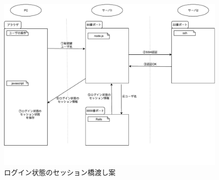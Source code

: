 \begin{figure}[h]
    \includegraphics[width=13cm]{fig/chapter3/botu1-1.pdf}
    \caption{ログイン状態のセッション橋渡し案} 
    \label{botu1-1}
\end{figure}

